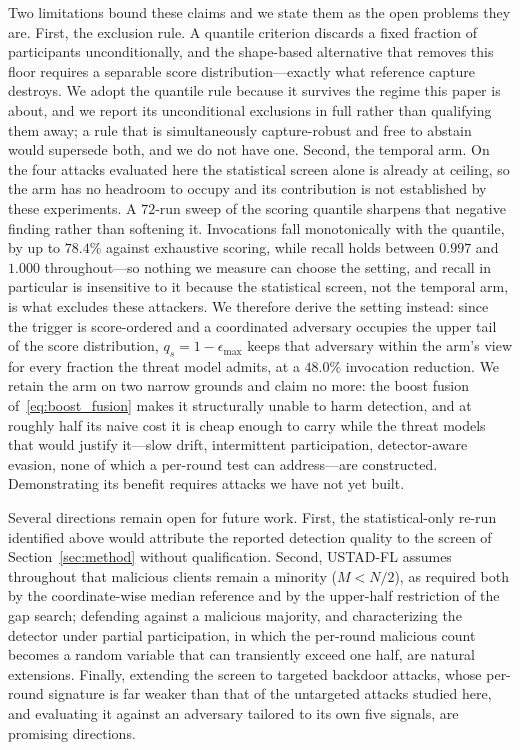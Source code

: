 \documentclass[journal]{IEEEtran}
\begin{document}
Two limitations bound these claims and we state them as the open problems they are. First, the exclusion rule. A quantile criterion discards a fixed fraction of participants unconditionally, and the shape-based alternative that removes this floor requires a separable score distribution---exactly what reference capture destroys. We adopt the quantile rule because it survives the regime this paper is about, and we report its unconditional exclusions in full rather than qualifying them away; a rule that is simultaneously capture-robust and free to abstain would supersede both, and we do not have one. Second, the temporal arm. On the four attacks evaluated here the statistical screen alone is already at ceiling, so the arm has no headroom to occupy and its contribution is not established by these experiments. A $72$-run sweep of the scoring quantile sharpens that negative finding rather than softening it. Invocations fall monotonically with the quantile, by up to $78.4\%$ against exhaustive scoring, while recall holds between $0.997$ and $1.000$ throughout---so nothing we measure can choose the setting, and recall in particular is insensitive to it because the statistical screen, not the temporal arm, is what excludes these attackers. We therefore derive the setting instead: since the trigger is score-ordered and a coordinated adversary occupies the upper tail of the score distribution, $q_s = 1-\epsilon_{\max}$ keeps that adversary within the arm's view for every fraction the threat model admits, at a $48.0\%$ invocation reduction. We retain the arm on two narrow grounds and claim no more: the boost fusion of~\eqref{eq:boost_fusion} makes it structurally unable to harm detection, and at roughly half its naive cost it is cheap enough to carry while the threat models that would justify it---slow drift, intermittent participation, detector-aware evasion, none of which a per-round test can address---are constructed. Demonstrating its benefit requires attacks we have not yet built.

Several directions remain open for future work. First, the statistical-only re-run identified above would attribute the reported detection quality to the screen of Section~\ref{sec:method} without qualification. Second, USTAD-FL assumes throughout that malicious clients remain a minority ($M < N/2$), as required both by the coordinate-wise median reference and by the upper-half restriction of the gap search; defending against a malicious majority, and characterizing the detector under partial participation, in which the per-round malicious count becomes a random variable that can transiently exceed one half, are natural extensions. Finally, extending the screen to targeted backdoor attacks, whose per-round signature is far weaker than that of the untargeted attacks studied here, and evaluating it against an adversary tailored to its own five signals, are promising directions.
\end{document}
